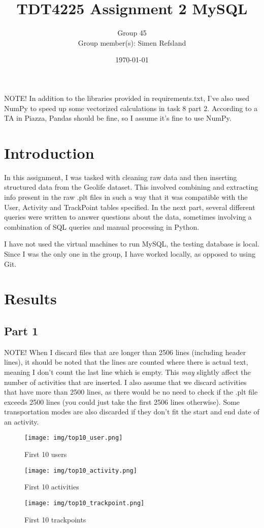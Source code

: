 \documentclass[12pt, titlepage]{report}
\title{TDT4225 Assignment 2 MySQL}
\author{Group 45 \\ Group member(s): Simen Refsland}
\date{\today}
\begin{document}
\maketitle
\pagestyle{fancy}
\newpage
NOTE! In addition to the libraries provided in requirements.txt, I've also used NumPy to speed up some vectorized calculations in task 8 part 2. According to a TA in Piazza, Pandas should be fine, so I assume it's fine to use NumPy.
\section*{Introduction}
In this assignment, I was tasked with cleaning raw data and then inserting structured data from the Geolife dataset. This involved combining and extracting info present in the raw .plt files in such a way that it was compatible with the User, Activity and TrackPoint tables specified. In the next part, several different queries were written to answer questions about the data, sometimes involving a combination of SQL queries and manual processing in Python.

I have not used the virtual machines to run MySQL, the testing database is local. Since I was the only one in the group, I have worked locally, as opposed to using Git.
\section*{Results}
\subsection*{Part 1}
NOTE! When I discard files that are longer than 2506 lines (including header lines), it should be noted that the lines are counted where there is actual text, meaning I don't count the last line which is empty. This \emph{may} slightly affect the number of activities that are inserted. I also assume that we discard activities that have more than 2500 lines, as there would be no need to check if the .plt file exceeds 2500 lines (you could just take the first 2506 lines otherwise). Some transportation modes are also discarded if they don't fit the start and end date of an activity.
\begin{figure}[H]
    \centering
    \texttt{[image: img/top10\_user.png]}
    \caption{First 10 users}
    \label{fig:my_label}
\end{figure}
\begin{figure}[H]
    \centering
    \texttt{[image: img/top10\_activity.png]}
    \caption{First 10 activities}
    \label{fig:my_label}
\end{figure}
\begin{figure}[H]
    \centering
    \texttt{[image: img/top10\_trackpoint.png]}
    \caption{First 10 trackpoints}
    \label{fig:my_label}
\end{figure}
\end{document}
